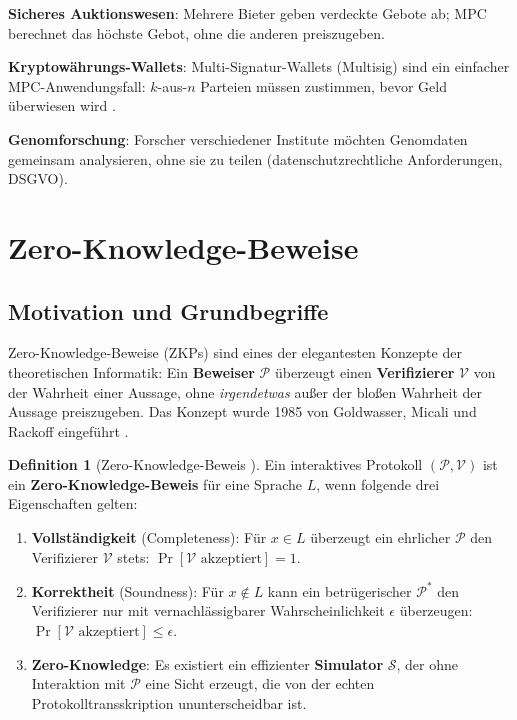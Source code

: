 ﻿\documentclass[a4paper,12pt]{scrreprt}
\theoremstyle{definition}
\newtheorem{definition}{Definition}[section]
\begin{document}
\textbf{Sicheres Auktionswesen}: Mehrere Bieter geben verdeckte Gebote ab; MPC berechnet das höchste Gebot, ohne die anderen preiszugeben.

\textbf{Kryptowährungs-Wallets}: Multi-Signatur-Wallets (Multisig) sind ein einfacher MPC-Anwendungsfall: $k$-aus-$n$ Parteien müssen zustimmen, bevor Geld überwiesen wird \cite{Nak08}.

\textbf{Genomforschung}: Forscher verschiedener Institute möchten Genomdaten gemeinsam analysieren, ohne sie zu teilen (datenschutzrechtliche Anforderungen, DSGVO).

\section{Zero-Knowledge-Beweise}

\subsection{Motivation und Grundbegriffe}

Zero-Knowledge-Beweise (ZKPs) sind eines der elegantesten Konzepte der theoretischen Informatik: Ein \textbf{Beweiser} $\mathcal{P}$ überzeugt einen \textbf{Verifizierer} $\mathcal{V}$ von der Wahrheit einer Aussage, ohne \emph{irgendetwas} außer der bloßen Wahrheit der Aussage preiszugeben. Das Konzept wurde 1985 von Goldwasser, Micali und Rackoff eingeführt \cite{GMR89}.

\begin{definition}[Zero-Knowledge-Beweis \cite{GMR89}]
Ein interaktives Protokoll $(\mathcal{P}, \mathcal{V})$ ist ein \textbf{Zero-Knowledge-Beweis} für eine Sprache $L$, wenn folgende drei Eigenschaften gelten:
\begin{enumerate}
    \item \textbf{Vollständigkeit} (Completeness): Für $x \in L$ überzeugt ein ehrlicher $\mathcal{P}$ den Verifizierer $\mathcal{V}$ stets: $\Pr[\mathcal{V} \text{ akzeptiert}] = 1$.
    \item \textbf{Korrektheit} (Soundness): Für $x \notin L$ kann ein betrügerischer $\mathcal{P}^*$ den Verifizierer nur mit vernachlässigbarer Wahrscheinlichkeit $\epsilon$ überzeugen: $\Pr[\mathcal{V} \text{ akzeptiert}] \leq \epsilon$.
    \item \textbf{Zero-Knowledge}: Es existiert ein effizienter \textbf{Simulator} $\mathcal{S}$, der ohne Interaktion mit $\mathcal{P}$ eine Sicht erzeugt, die von der echten Protokolltransskription ununterscheidbar ist.
\end{enumerate}
\end{definition}
\end{document}
